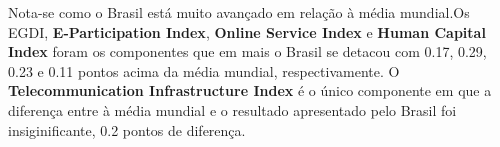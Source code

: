 Nota-se como o Brasil está muito avançado em relação à média mundial.Os EGDI, \textbf{E-Participation Index}, \textbf{Online Service Index} e \textbf{Human Capital Index} foram os componentes que em mais o Brasil se detacou com 0.17, 0.29, 0.23 e 0.11 pontos acima da média mundial, respectivamente. O \textbf{Telecommunication Infrastructure Index} é o único componente em que a diferença entre à média mundial e o resultado apresentado pelo Brasil foi insiginificante, 0.2 pontos de diferença.

